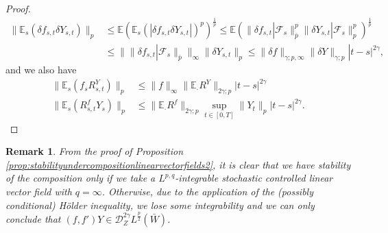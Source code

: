 \documentclass[11pt,a4paper]{article}
\newcommand{\E}{\mathbb{E}}
\theoremstyle{plain}
\newtheorem{rmk}[defn]{Remark}
\begin{document}
\begin{proof}
\begin{equation*}
    \begin{aligned}
        \|\E_s(\delta f_{s,t}\delta Y_{s,t})\|_p &\le \E(\E_s(|\delta f_{s,t}\delta Y_{s,t}|)^p)^{\frac{1}{p}} \le \E(\|\delta f_{s,t}|\mathcal{F}_s\|_{\bar{p}}^p \|\delta Y_{s,t}|\mathcal{F}_s\|_p^p)^{\frac{1}{p}}  \\
        &\le \|\|\delta f_{s,t}|\mathcal{F}_s\|_{\bar{p}}\|_\infty \|\delta Y_{s,t}\|_p \le \|\delta f\|_{\gamma;p,\infty}\|\delta Y\|_{\gamma;p} |t-s|^{2\gamma},
    \end{aligned}
\end{equation*} 
and we also have \begin{align*}
    \|\E_s(f_sR^Y_{s,t})\|_p &\le  \|f\|_\infty \|\E_\cdot R^Y\|_{2\gamma;p} |t-s|^{2\gamma} \\ 
    \|\E_s(R^{f}_{s,t}Y_s)\|_p &\le  \|\E_\cdot R^f\|_{2\gamma;p} \sup_{t\in [0,T]}\|Y_t\|_p |t-s|^{2\gamma}.
\end{align*}
\end{proof}

\begin{rmk}
    From the proof of Proposition \ref{prop:stabilityundercompositionlinearvectorfields2}, it is clear that we have stability of the composition only if we take a $L^{p,q}$-integrable stochastic controlled linear vector field with $q=\infty$. Otherwise, due to the application of the (possibly conditional) Hölder inequality, we lose some integrability and we can only conclude that $(f,f')Y \in \mathscr{D}_Z^{2\gamma}L^\frac{p}{2}(\bar{W})$.
\end{rmk}
\end{document}
